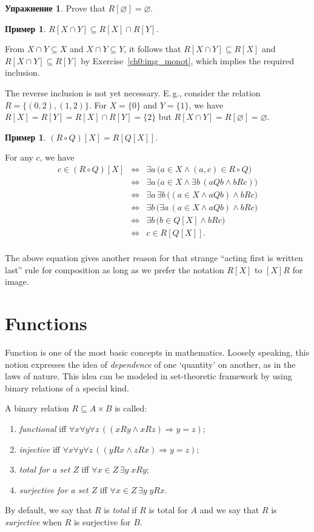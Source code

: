 \documentclass[12pt,notitlepage]{article}
\theoremstyle{plain}
\theoremstyle{definition}
\newtheorem{exc}[thm]{Упражнение}
\newtheorem{exm}[thm]{Пример}
\theoremstyle{plain}
\newcommand{\sbs}{\subseteq}
\newcommand{\void}{\varnothing}
\newcommand{\1}{\mathbf{1}}
\newcommand{\0}{\mathbf{0}}
\newcommand{\ply}{\Longrightarrow}
\begin{document}
\begin{exc}
	Prove that $R[\void] = \void$.
\end{exc}

\begin{exm}\label{ch0:exm25}
	$R[X \cap Y] \sbs R[X] \cap R[Y]$.
	
	From $X \cap Y \sbs X$ and $X \cap Y \sbs Y$, it follows that $R[X \cap Y] \sbs R[X]$ and $R[X \cap Y] \sbs R[Y]$ by Exercise~\ref{ch0:img_monot}, which implies the required inclusion.
	
	The reverse inclusion is not yet necessary. E.\,g., consider the relation $R = \{(0,2), (1,2)\}$. For $X = \{0\}$ and $Y = \{1\}$, we have $R[X] = R[Y] = R[X] \cap R[Y]  = \{2\}$ but $R[X \cap Y] = R[\void] = \void$.
\end{exm}

\begin{exm}
	$(R \circ Q)[X] = R[Q[X]]$.
	
	For any $c$, we have
	$$
	\begin{array}{rcl}
		c \in (R \circ Q)[X] &\iff& \exists a\, \bigl( a \in X \wedge (a,c) \in R \circ Q \bigr)\\
		&\iff& \exists a\, \bigl( a \in X \wedge \exists b\, ( a Q b \wedge b R c) \bigr)\\
		&\iff& \exists a\, \exists b\,\bigl( (a \in X \wedge a Q b) \wedge b R c \bigr)\\
		&\iff& \exists b\, \bigl( \exists a\, (a \in X \wedge a Q b) \wedge b R c \bigr)\\
		&\iff& \exists b\, \bigl( b \in Q[X] \wedge b R c \bigr)\\
		&\iff& c \in R[Q[X]].\\
	\end{array}
	$$
\end{exm}
The above equation gives another reason for that strange ``acting first is written last'' rule for composition as long as we prefer the notation $R[X]$ to $[X]R$ for image. 
\section{Functions}
Function is one of the most basic concepts in mathematics. Loosely speaking, this notion expresses the idea of \emph{dependence} of one `quantity' on another, as in the laws of nature. This idea can be modeled in set-theoretic framework by using binary relations of a special kind.

A binary relation $R \sbs A \times B$ is called:
\begin{enumerate}
	\item \emph{functional} iff $\forall x \forall y \forall z\, ( (x R y \wedge x R z) \ply y = z )$;
	\item \emph{injective} iff $\forall x \forall y \forall z\, ( (y R x \wedge z R x) \ply y = z )$;
	\item \emph{total for a set $Z$} iff $\forall x \in Z\, \exists y\; x R y$;
	\item \emph{surjective for a set $Z$} iff $\forall x \in Z\, \exists y\; y R x$.
\end{enumerate}
By default, we say that $R$ is \emph{total} if $R$ is total for $A$ and we say that $R$ is \emph{surjective} when $R$ is surjective for $B$.
\end{document}
